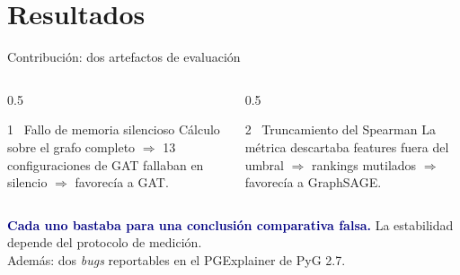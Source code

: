 \documentclass[aspectratio=169,11pt]{beamer}
\begin{document}
\section{Resultados}

\begin{frame}{Contribución: dos artefactos de evaluación}
\begin{columns}[T]
\begin{column}{0.5\textwidth}
\begin{alertblock}{1 \textperiodcentered\ Fallo de memoria silencioso}
\small Cálculo sobre el grafo completo $\Rightarrow$ 13 configuraciones de GAT fallaban en silencio $\Rightarrow$ favorecía a GAT.
\end{alertblock}
\end{column}
\begin{column}{0.5\textwidth}
\begin{alertblock}{2 \textperiodcentered\ Truncamiento del Spearman}
\small La métrica descartaba features fuera del umbral $\Rightarrow$ rankings mutilados $\Rightarrow$ favorecía a GraphSAGE.
\end{alertblock}
\end{column}
\end{columns}
\vspace{7pt}
\begin{center}\small
\textcolor{navy}{\textbf{Cada uno bastaba para una conclusión comparativa falsa.}} La estabilidad depende del protocolo de medición.\\ Además: dos \textit{bugs} reportables en el PGExplainer de PyG 2.7.
\end{center}
\end{frame}
\end{document}
